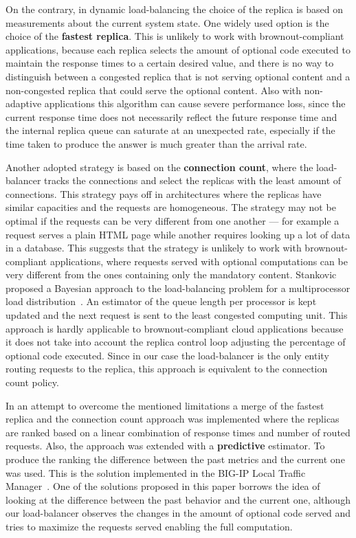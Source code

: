 On the contrary, in dynamic load-balancing the choice of the replica
is based on measurements about the current system state. One widely
used option is the choice of the \textbf{fastest replica}. This is
unlikely to work with brownout-compliant applications, because each
replica selects the amount of optional code executed to maintain the
response times to a certain desired value, and there is no way to
distinguish between a congested replica that is not serving optional
content and a non-congested replica that could serve the optional
content. Also with non-adaptive applications this algorithm can cause
severe performance loss, since the current response time does not
necessarily reflect the future response time and the internal replica
queue can saturate at an unexpected rate, especially if the time taken
to produce the answer is much greater than the arrival rate.

Another adopted strategy is based on the \textbf{connection count},
where the load-balancer tracks the connections and select the replicas
with the least amount of connections. This strategy pays off in
architectures where the replicas have similar capacities and the
requests are homogeneous. The strategy may not be optimal if the
requests can be very different from one another --- for example a
request serves a plain HTML page while another requires looking up a
lot of data in a database. This suggests that the strategy is unlikely
to work with brownout-compliant applications, where requests served
with optional computations can be very different from the ones
containing only the mandatory content. Stankovic proposed a Bayesian
approach to the load-balancing problem for a multiprocessor load
distribution~\cite{Stankovic:TC}. An estimator of the queue length per
processor is kept updated and the next request is sent to the least
congested computing unit. This approach is hardly applicable to
brownout-compliant cloud applications because it does not take into
account the replica control loop adjusting the percentage of optional
code executed. Since in our case the load-balancer is the only entity
routing requests to the replica, this approach is equivalent to the
connection count policy.

In an attempt to overcome the mentioned limitations a merge of the
fastest replica and the connection count approach was implemented
where the replicas are ranked based on a linear combination of
response times and number of routed requests. Also, the approach was
extended with a \textbf{predictive} estimator. To produce the ranking
the difference between the past metrics and the current one was
used. This is the solution implemented in the BIG-IP Local Traffic
Manager~\cite{BIGIP}. One of the solutions proposed in this paper
borrows the idea of looking at the difference between the past
behavior and the current one, although our load-balancer observes the
changes in the amount of optional code served and tries to maximize
the requests served enabling the full computation.
